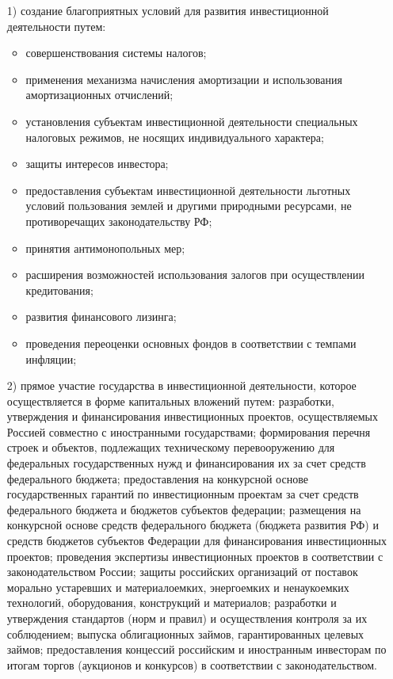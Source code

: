 \begin{enumerate}
	\item [1)] создание благоприятных условий для развития инвестиционной деятельности путем:

\begin{itemize}
	\item совершенствования системы налогов;
\item применения механизма начисления амортизации и использования амортизационных отчислений;
\item установления субъектам инвестиционной деятельности специальных налоговых режимов, не носящих индивидуального характера;
\item защиты интересов инвестора;
\item предоставления субъектам инвестиционной деятельности льготных условий пользования землей и другими природными ресурсами, не противоречащих законодательству РФ;
\item принятия антимонопольных мер;
\item расширения возможностей использования залогов при осуществлении кредитования;
\item развития финансового лизинга;
\item проведения переоценки основных фондов в соответствии с темпами инфляции;
\end{itemize}
\item [2)] прямое участие государства в инвестиционной деятельности, которое осуществляется в форме капитальных вложений путем: разработки, утверждения и финансирования инвестиционных проектов, осуществляемых Россией совместно с иностранными государствами; формирования перечня строек и объектов, подлежащих техническому перевооружению для федеральных государственных нужд и финансирования их за счет средств федерального бюджета; предоставления на конкурсной основе государственных гарантий по инвестиционным проектам за счет средств федерального бюджета и бюджетов субъектов федерации; размещения на конкурсной основе средств федерального бюджета (бюджета развития РФ) и средств бюджетов субъектов Федерации для финансирования инвестиционных проектов; проведения экспертизы инвестиционных проектов в соответствии с законодательством России; защиты российских организаций от поставок морально устаревших и материалоемких, энергоемких и ненаукоемких технологий, оборудования, конструкций и материалов; разработки и утверждения стандартов (норм и правил) и осуществления контроля за их соблюдением; выпуска облигационных займов, гарантированных целевых займов; предоставления концессий российским и иностранным инвесторам по итогам торгов (аукционов и конкурсов) в соответствии с законодательством.
\end{enumerate}

